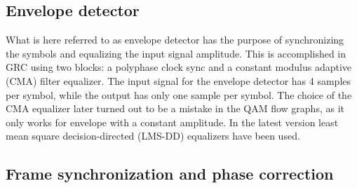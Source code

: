 \subsection{Envelope detector}

What is here referred to as envelope detector has the purpose of synchronizing the symbols and equalizing the input signal amplitude. This is accomplished in GRC using two blocks: a polyphase clock sync and a constant modulus adaptive (CMA) filter equalizer. The input signal for the envelope detector has 4 samples per symbol, while the output has only one sample per symbol. The choice of the CMA equalizer later turned out to be a mistake in the QAM flow graphs, as it only works for envelope with a constant amplitude. In the latest version least mean square decision-directed (LMS-DD) equalizers have been used.



\subsection{Frame synchronization and phase correction} \label{sec:phasecorr}

